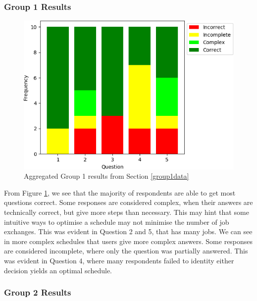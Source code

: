 \subsubsection{Group 1 Results}

\begin{figure}[H]
	\label{group1chart}
	\begin{center}
		\includegraphics[scale=0.55]{figures/questionnaire_results_group_one}
	\end{center}
	\caption{Aggregated Group 1 results from Section \ref{group1data}}
\end{figure}

From Figure \ref{group1chart}, we see that the majority of respondents are able to get most questions correct. Some responses are considered complex, when their answers are technically correct, but give more steps than necessary. This may hint that some intuitive ways to optimise a schedule may not minimise the number of job exchanges. This was evident in Question 2 and 5, that has many jobs. We can see in more complex schedules that users give more complex answers. Some responses are considered incomplete, where only the question was partially answered. This was evident in Question 4, where many respondents failed to identity either decision yields an optimal schedule.

\subsubsection{Group 2 Results}

